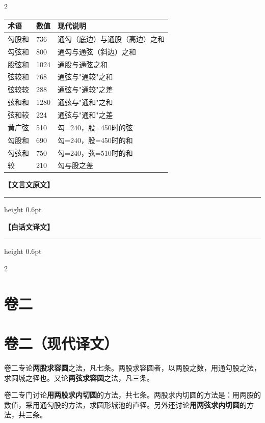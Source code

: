 \documentclass[11pt,a4paper]{article}
\newcommand{\colheaders}{%
  \noindent\begin{minipage}[t]{0.48\textwidth}\centering
    \textbf{\color{classicalframe}【文言文原文】}
    \vspace{0.3em}
    \hrule height 0.6pt
  \end{minipage}%
  \hfill
  \begin{minipage}[t]{0.48\textwidth}\centering
    \textbf{\color{modernframe}【白话文译文】}
    \vspace{0.3em}
    \hrule height 0.6pt
  \end{minipage}
  \par\medskip
}
\begin{document}
\begin{paracol}{2}
\begin{center}
\begin{tabular}{|l|l|p{4.5cm}|}
\hline
\textbf{术语} & \textbf{数值} & \textbf{现代说明} \\
\hline
勾股和 & 736 & 通勾（底边）与通股（高边）之和 \\
\hline
勾弦和 & 800 & 通勾与通弦（斜边）之和 \\
\hline
股弦和 & 1024 & 通股与通弦之和 \\
\hline
弦较和 & 768 & 通弦与"通较"之和 \\
\hline
弦较较 & 288 & 通弦与"通较"之差 \\
\hline
弦和和 & 1280 & 通弦与"通和"之和 \\
\hline
弦和较 & 224 & 通弦与"通和"之差 \\
\hline
黄广弦 & 510 & 勾=240，股=450时的弦 \\
\hline
勾股和 & 690 & 勾=240，股=450时的和 \\
\hline
勾弦和 & 750 & 勾=240，弦=510时的和 \\
\hline
较 & 210 & 勾与股之差 \\
\hline
\end{tabular}
\end{center}

\switchcolumn*

\end{paracol}
\clearpage
\colheaders
\begin{paracol}{2}

\section{卷二}

\switchcolumn
\section*{卷二（现代译文）}

\switchcolumn*

卷二专论\textbf{两股求容圆}之法，凡七条。两股求容圆者，以两股之数，用通勾股之法，求圆城之径也。又论\textbf{两弦求容圆}之法，凡三条。

\switchcolumn

卷二专门讨论\textbf{用两股求内切圆}的方法，共七条。两股求内切圆的方法是：用两股的数值，采用通勾股的方法，求圆形城池的直径。另外还讨论\textbf{用两弦求内切圆}的方法，共三条。

\switchcolumn*

\end{paracol}
\end{document}
